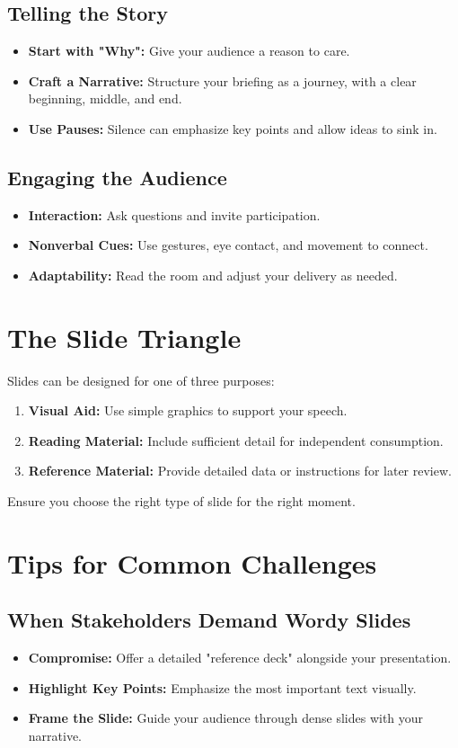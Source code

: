 \documentclass[12pt]{article}
\begin{document}
\subsection{Telling the Story}
\begin{itemize}
    \item \textbf{Start with "Why":} Give your audience a reason to care.
    \item \textbf{Craft a Narrative:} Structure your briefing as a journey, with a clear beginning, middle, and end.
    \item \textbf{Use Pauses:} Silence can emphasize key points and allow ideas to sink in.
\end{itemize}

\subsection{Engaging the Audience}
\begin{itemize}
    \item \textbf{Interaction:} Ask questions and invite participation.
    \item \textbf{Nonverbal Cues:} Use gestures, eye contact, and movement to connect.
    \item \textbf{Adaptability:} Read the room and adjust your delivery as needed.
\end{itemize}

\section{The Slide Triangle}
Slides can be designed for one of three purposes:
\begin{enumerate}
    \item \textbf{Visual Aid:} Use simple graphics to support your speech.
    \item \textbf{Reading Material:} Include sufficient detail for independent consumption.
    \item \textbf{Reference Material:} Provide detailed data or instructions for later review.
\end{enumerate}
Ensure you choose the right type of slide for the right moment.

\section{Tips for Common Challenges}
\subsection{When Stakeholders Demand Wordy Slides}
\begin{itemize}
    \item \textbf{Compromise:} Offer a detailed "reference deck" alongside your presentation.
    \item \textbf{Highlight Key Points:} Emphasize the most important text visually.
    \item \textbf{Frame the Slide:} Guide your audience through dense slides with your narrative.
\end{itemize}
\end{document}
